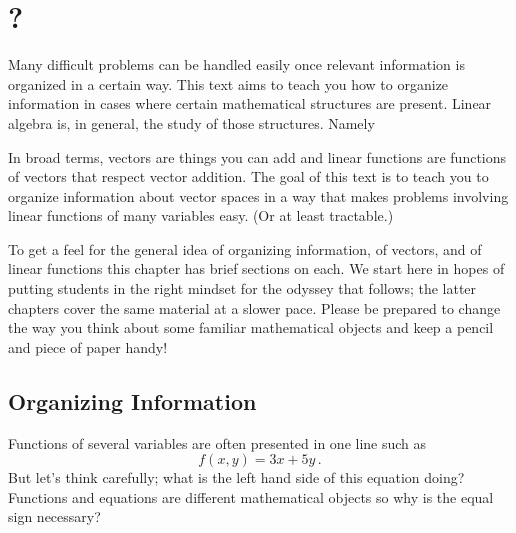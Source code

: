 \chapter{\whatIsTitle?}\label{warmup}


Many difficult problems can be handled easily 
once  relevant information is organized in a certain way. 
This text aims to teach you how to organize information in cases where certain mathematical structures are present. 
Linear algebra is, in general, the study of those structures. Namely

\vspace{3mm}
\vspace{3mm}

\noindent In broad terms, vectors are things you can add and  linear functions are %
functions of vectors that respect vector addition. 
The goal of this text is to teach you to organize information about vector spaces in a way that makes problems involving linear functions of many variables easy. 
(Or at least tractable.) 

To get a feel for the general idea of organizing information, of vectors, and of linear functions this chapter has brief sections on each. 
We start here in hopes of putting students in the right mindset for the 
odyssey that follows; the latter chapters cover the same material at a slower pace.  
Please be prepared to change the way you think about some familiar mathematical objects
and keep a pencil and piece of paper handy!

\section{Organizing Information}
\label{organize}
Functions of several variables are often presented in one line such as 
\[f(x,y)=3x+5y\,.\]
But let's think carefully; what is the left hand side of this equation doing? 
Functions and equations are different mathematical objects so why is the equal sign necessary?

